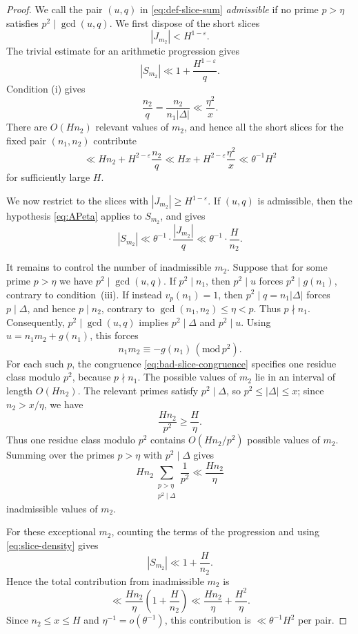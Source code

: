 \documentclass[12pt,reqno]{amsart}
\numberwithin{equation}{section}
\theoremstyle{definition}
\renewcommand{\le}{\leqslant}
\renewcommand{\ge}{\geqslant}
\renewcommand{\pmod}[1]{\,(\mathrm{mod}\,#1)}
\begin{document}
\begin{proof}
We call the pair $(u,q)$ in \eqref{eq:def-slice-sum} \emph{admissible} if no prime $p>\eta$ satisfies $p^2\mid \gcd(u,q)$.
We first dispose of the short slices
\begin{equation}\label{eq:short-slice}
|J_{m_2}|<H^{1-\varepsilon}.
\end{equation}
The trivial estimate for an arithmetic progression gives
\[
|S_{m_2}|
\ll 1+\frac{H^{1-\varepsilon}}q.
\]
Condition \textup{(i)} gives
\[
\frac{n_2}{q}
=\frac{n_2}{n_1|\Delta|}
\ll\frac{\eta^2}{x}.
\]
There are $O(Hn_2)$ relevant values of $m_2$, and hence all the short slices for the fixed pair $(n_1,n_2)$ contribute
\[
\ll Hn_2+H^{2-\varepsilon}\frac{n_2}{q}
\ll Hx+H^{2-\varepsilon}\frac{\eta^2}{x}
\ll \theta^{-1}H^2
\]
for sufficiently large $H$.

We now restrict to the slices with $|J_{m_2}|\ge H^{1-\varepsilon}$.
If $(u,q)$ is admissible, then the hypothesis \eqref{eq:APeta} applies to $S_{m_2}$, and gives
\begin{equation}\label{eq:good-slice-bound}
|S_{m_2}|
\ll \theta^{-1}\cdot \frac{|J_{m_2}|}{q}
\ll \theta^{-1}\cdot \frac{H}{n_2}.
\end{equation}

It remains to control the number of inadmissible $m_2$.
Suppose that for some prime $p>\eta$ we have $p^2\mid\gcd(u,q)$.
If $p^2\mid n_1$, then $p^2\mid u$ forces $p^2\mid g(n_1)$, contrary to condition~\textup{(iii)}.
If instead $v_p(n_1)=1$, then $p^2\mid q=n_1|\Delta|$ forces $p\mid\Delta$, and hence $p\mid n_2$, contrary to $\gcd(n_1,n_2)\le\eta<p$.
Thus $p\nmid n_1$.
Consequently, $p^2\mid \gcd(u,q)$ implies $p^2\mid\Delta$ and $p^2\mid u$.
Using $u=n_1m_2+g(n_1)$, this forces
\begin{equation}\label{eq:bad-slice-congruence}
n_1m_2 \equiv -g(n_1)\pmod{p^2}.
\end{equation}
For each such $p$, the congruence \eqref{eq:bad-slice-congruence} specifies one residue class modulo $p^2$, because $p\nmid n_1$.
The possible values of $m_2$ lie in an interval of length $O(Hn_2)$.
The relevant primes satisfy $p^2\mid \Delta$, so $p^2\le |\Delta|\le x$; since $n_2>x/\eta$, we have
\[
\frac{Hn_2}{p^2}\ge \frac{H}{\eta}.
\]
Thus one residue class modulo $p^2$ contains $O(Hn_2/p^2)$ possible values of $m_2$.
Summing over the primes $p>\eta$ with $p^2\mid\Delta$ gives
\[
Hn_2 \sum_{\substack{p>\eta\\p^2\mid\Delta}}\frac1{p^2}
\ll \frac{Hn_2}{\eta}
\]
inadmissible values of $m_2$.

For these exceptional $m_2$, counting the terms of the progression and using \eqref{eq:slice-density} gives
\[
|S_{m_2}|\ll 1+\frac{H}{n_2}.
\]
Hence the total contribution from inadmissible $m_2$ is
\[
\ll \frac{H n_2}{\eta}\left(1+\frac{H}{n_2}\right)
\ll \frac{H n_2}{\eta}+\frac{H^2}{\eta}.
\]
Since $n_2\le x\le H$ and $\eta^{-1}=o(\theta^{-1})$, this contribution is $\ll \theta^{-1}H^2$ per pair.


\end{proof}
\end{document}
